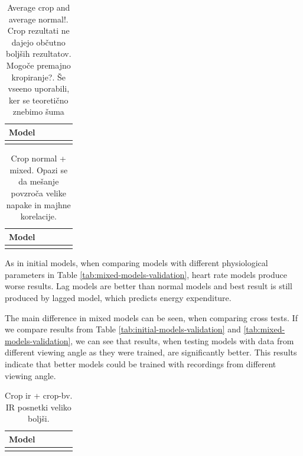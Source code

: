 \begin{table}[!htbp]
	\centering
	\begin{tabular}{l S[table-format=1.2, round-mode=places, round-precision=2] S[table-format=1.2, round-mode=places, round-precision=2] S[table-format=1.2, round-mode=places, round-precision=2] S[table-format=1.2, round-mode=places, round-precision=2]}
		\toprule
		\textbf{Model} &  &  &  &  \\
		\midrule
		\bottomrule
	\end{tabular}
	\caption{Average crop and average normal!. Crop rezultati ne dajejo občutno boljših rezultatov. Mogoče premajno kropiranje?. Še vseeno uporabili, ker se teoretično znebimo šuma}
	\label{tab:rocni-izrez}
\end{table}


\begin{table}[!htbp]
	\centering
	\begin{tabular}{l S[table-format=1.2, round-mode=places, round-precision=2] S[table-format=1.2, round-mode=places, round-precision=2] S[table-format=1.2, round-mode=places, round-precision=2] S[table-format=1.2, round-mode=places, round-precision=2]}
		\toprule
		\textbf{Model} &  &  &  &  \\
		\midrule
		\bottomrule
	\end{tabular}
	\caption{Crop normal + mixed. Opazi se da mešanje povzroča velike napake in majhne korelacije. }
	\label{tab:zorni-kot}
\end{table}
As in initial models, when comparing models with different physiological parameters in Table \ref{tab:mixed-models-validation}, heart rate models produce worse results. Lag models are better than normal models and best result is still produced by lagged model, which predicts energy expenditure.

The main difference in mixed models can be seen, when comparing cross tests. If we compare results from Table \ref{tab:initial-models-validation} and \ref{tab:mixed-models-validation}, we can see that results, when testing models with data from different viewing angle as they were trained, are significantly better. This results indicate that better models could be trained with recordings from different viewing angle.



\begin{table}[!htbp]
	\centering
	\begin{tabular}{l S[table-format=1.2, round-mode=places, round-precision=2] S[table-format=1.2, round-mode=places, round-precision=2] S[table-format=1.2, round-mode=places, round-precision=2] S[table-format=1.2, round-mode=places, round-precision=2]}
		\toprule
		\textbf{Model} &  &  &  &  \\
		\midrule
		\bottomrule
	\end{tabular}
	\caption{Crop ir + crop-bv. IR posnetki veliko boljši.}
	\label{tab:crop-ir}
\end{table}






